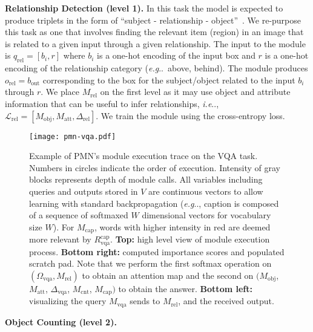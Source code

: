 \documentclass{article}
\makeatletter
\newcommand{\SK}[1]{{\color{NavyBlue}{[@Seung: #1]}}}
\def\PMN{PMN}
\def\Mobj{M_\mathrm{obj}}
\def\Matt{M_\mathrm{att}}
\def\Mrel{M_\mathrm{rel}}
\def\Mcnt{M_\mathrm{cnt}}
\def\Mcap{M_\mathrm{cap}}
\def\Mvqa{M_\mathrm{vqa}}
\DeclareRobustCommand\onedot{\futurelet\@let@token\@onedot}
\def\@onedot{\ifx\@let@token.\else.\null\fi\xspace}
\def\eg{\emph{e.g}\onedot} \def\Eg{\emph{E.g}\onedot}
\def\ie{\emph{i.e}\onedot} \def\Ie{\emph{I.e}\onedot}
\makeatother
\begin{document}
\textbf{Relationship Detection (level 1).}\hspace{2mm}
In this task the model is expected to produce triplets in the form of ``subject - relationship - object''~\citep{lu2016visual}.
We re-purpose this task as one that involves finding the relevant item (region) in an image that is related to a given input through a given relationship.
The input to the module is $q_\mathrm{rel}=[b_i, r]$ where $b_i$ is a one-hot encoding of the input box %
and $r$ is a one-hot encoding of the  relationship category (\eg~above, behind).
The module produces $o_\mathrm{rel}=b_\mathrm{out}$ corresponding to the box for the subject/object related to the input $b_i$ through $r$.
We place $\Mrel$ on the first level as it may use object and attribute information that can be useful to infer relationships, \ie, $\mathcal L_\mathrm{rel} = [\Mobj, \Matt, \Delta_\mathrm{rel}]$.
We train the module using the cross-entropy loss.
\begin{figure}[t!]
\vspace{-6mm}
\begin{center}
\texttt{[image: pmn-vqa.pdf]}
\end{center}
\vspace{-2mm}
\caption{\small Example of \PMN's module execution trace on the VQA task.
Numbers in circles indicate the order of execution.
Intensity of gray blocks represents depth of module calls.
All variables including queries and outputs stored in $V$ are continuous vectors to allow learning with standard backpropagation
(\eg, caption is composed of a sequence of softmaxed $W$ dimensional vectors for vocabulary size $W$).
For $\Mcap$, words with higher intensity in red are deemed more relevant by $R_\mathrm{vqa}^\mathrm{cap}$.
\textbf{Top:} high level view of module execution process.
\textbf{Bottom right:} computed importance scores and populated scratch pad.
Note that we perform the first softmax operation on $(\Omega_\mathrm{vqa}, \Mrel)$ to obtain an attention map and the second on $(\Mobj$, $\Matt$, $\Delta_\mathrm{vqa}$, $\Mcnt$, $\Mcap)$ to obtain the answer.
\textbf{Bottom left:} visualizing the query $\Mvqa$ sends to $\Mrel$, and the received output.}
\label{fig:execution_vqa}
\vspace{-4mm}
\end{figure}\textbf{Object Counting (level 2).}\hspace{2mm}
\end{document}
